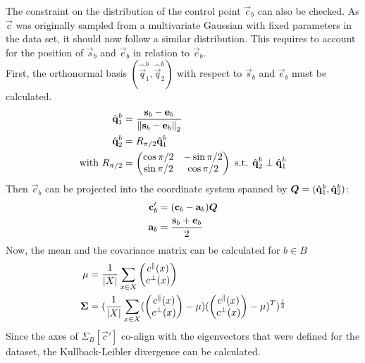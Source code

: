 The constraint on the distribution of the control point $\vec{c}_b$ can also be checked.
As $\vec{c}$ was originally sampled from a multivariate Gaussian with fixed parameters in the data set, it should now follow a similar distribution.
This requires to account for the position of  $\vec{s}_b$ and $\vec{e}_b$ in relation to $\vec{c}_b$.\\
First, the orthonormal basis $(\hat{\vec{q}}^b_1, \hat{\vec{q}}^b_2)$ with respect to $\vec{s}_b$ and $\vec{e}_b$ must be calculated.
\begin{align}
    \hat{\mathbf{q}}^b_1 & = \frac{\mathbf{s}_b - \mathbf{e}_b}{\left\lVert\mathbf{s}_b - \mathbf{e}_b\right\rVert_2} \\
    \hat{\mathbf{q}}^b_2 & = R_{\pi/2} \hat{\mathbf{q}}^b_1 \\
    \text{with } R_{\pi/2} & =
    \begin{pmatrix}
        \cos \pi/2 & -\sin \pi/2 \\
        \sin \pi/2 & \cos \pi/2
    \end{pmatrix} \text{ s.t. } \hat{\mathbf{q}}^b_2 \perp \hat{\mathbf{q}}^b_1
\end{align}
Then $\vec{c}_b$ can be projected into the coordinate system spanned by  $\boldsymbol{Q} = (\hat{\mathbf{q}}^b_1, \hat{\mathbf{q}}^b_2)$:
\begin{align}
    \mathbf{c}'_b & = (\mathbf{c}_b - \mathbf{a}_b) \boldsymbol{Q} \\
    \mathbf{a}_b & = \frac{\mathbf{s}_b + \mathbf{e}_b}{2}
\end{align}
Now, the mean and the covariance matrix can be calculated for $b \in B$
\begin{align}
    \mathbf{\mu} & = \frac{1}{\vert X \vert}\sum_{x \in X} \begin{pmatrix} c^\parallel(x) \\ c^\bot(x) \end{pmatrix} \\
    \boldsymbol{\Sigma} & = (\frac{1}{\vert X \vert} \sum_{x \in X}
        (\begin{pmatrix} c^\parallel(x) \\ c^\bot(x) \end{pmatrix} - \mathbf{\mu})
        (\begin{pmatrix} c^\parallel(x) \\ c^\bot(x) \end{pmatrix} - \mathbf{\mu})^T
        )^{\frac{1}{2}} \\
\end{align}
Since the axes of $\Sigma_B[\vec{c}']$ co-align with the eigenvectors that were defined for the dataset, the Kullback-Leibler divergence can be calculated.
